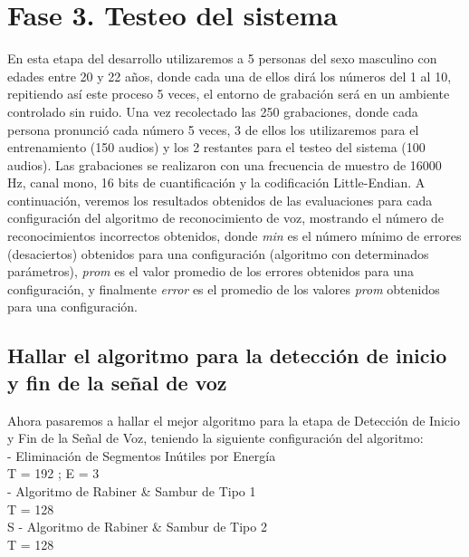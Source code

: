 \newpage
\section{Fase 3. Testeo del sistema}
En esta etapa del desarrollo utilizaremos a 5 personas del sexo masculino con edades entre 20 y 22 años, donde cada una de ellos dirá los números del 1 al 10, repitiendo así este proceso 5 veces, el entorno de grabación será en un ambiente controlado sin ruido.
\vskip 0.5cm
Una vez recolectado las 250 grabaciones, donde cada persona pronunció cada número 5 veces, 3 de ellos los utilizaremos para el entrenamiento (150 audios) y los 2 restantes para el testeo del sistema (100 audios). Las grabaciones se realizaron con una frecuencia de muestro de 16000 Hz, canal mono, 16 bits de cuantificación y la codificación Little-Endian.
\vskip 0.5cm
A continuación, veremos los resultados obtenidos de las evaluaciones para cada configuración del algoritmo de reconocimiento de voz, mostrando el número de reconocimientos incorrectos obtenidos, donde \textit{min} es el número mínimo de errores (desaciertos) obtenidos para una configuración (algoritmo con determinados parámetros), \textit{prom} es el valor promedio de los errores obtenidos para una configuración, y finalmente \textit{error} es el promedio de los valores \textit{prom} obtenidos para una configuración.



\subsection{Hallar el algoritmo para la detección de inicio y fin de la señal de voz}
Ahora pasaremos a hallar el mejor algoritmo para la etapa de Detección de Inicio y Fin de la Señal de Voz, teniendo la siguiente configuración del algoritmo: \\
- Eliminación de Segmentos Inútiles por Energía \\
\hspace*{1cm} T = 192 ; \qquad E = 3 \\
- Algoritmo de Rabiner \& Sambur de Tipo 1 \\
\hspace*{1cm} T = 128 \\S
- Algoritmo de Rabiner \& Sambur de Tipo 2 \\
\hspace*{1cm} T = 128 

